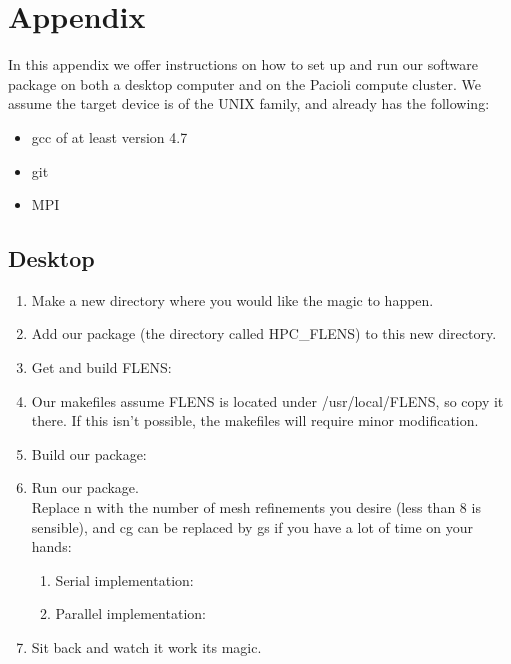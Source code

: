 \newpage
\appendix
\section{Appendix}

In this appendix we offer instructions on how to set up and run our software package on both a desktop computer and on the Pacioli compute cluster. We assume the target device is of the UNIX family, and already has the following:

\begin{itemize}
   \item gcc of at least version 4.7
   \item git
   \item MPI
\end{itemize}

\subsection{Desktop}

\begin{enumerate}
   \item Make a new directory where you would like the magic to happen.
   \item Add our package (the directory called HPC\_FLENS) to this new directory.
   \item Get and build FLENS: 
   
   \item Our makefiles assume FLENS is located under /usr/local/FLENS, so copy it there. If this isn't possible, the makefiles will require minor modification.
   
   \item Build our package:
   
   \item Run our package.\\
   Replace n with the number of mesh refinements you desire (less than 8 is sensible), and cg can be replaced by gs if you have a lot of time on your hands:
   
   \begin{enumerate}
   
      \item Serial implementation:
      \item Parallel implementation:
      
   \end{enumerate}
   
   \item Sit back and watch it work its magic.
\end{enumerate}
      
